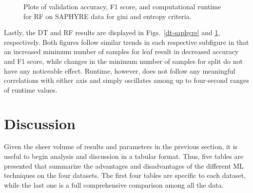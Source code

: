 \documentclass[12pt]{uthesis-v12}  %
\begin{document}
\begin{figure}
	\hfill	
{}
						
\caption{Plots of validation accuracy, F1 score, and computational runtime for RF on SAPHYRE data for gini and entropy criteria.}
	\label{rfr-saphyre}
	\end{figure}
	
Lastly, the DT and RF results are displayed in Figs.~\ref{dt-saphyre} and \ref{rfr-saphyre}, respectively. Both figures follow similar trends in each respective subfigure in that an increased minimum number of samples for leaf result in decreased accuracy and F1 score, while changes in the minimum number of samples for split do not have any noticeable effect. Runtime, however, does not follow any meaningful correlations with either axis and simply oscillates among up to four-second ranges of runtime values.

\section{Discussion}

Given the sheer volume of results and parameters in the previous section, it is useful to begin analysis and discussion in a tabular format. Thus, five tables are presented that summarize the advantages and disadvantages of the different ML techniques on the four datasets. The first four tables are specific to each dataset, while the last one is a full comprehensive comparison among all the data.
\end{document}

